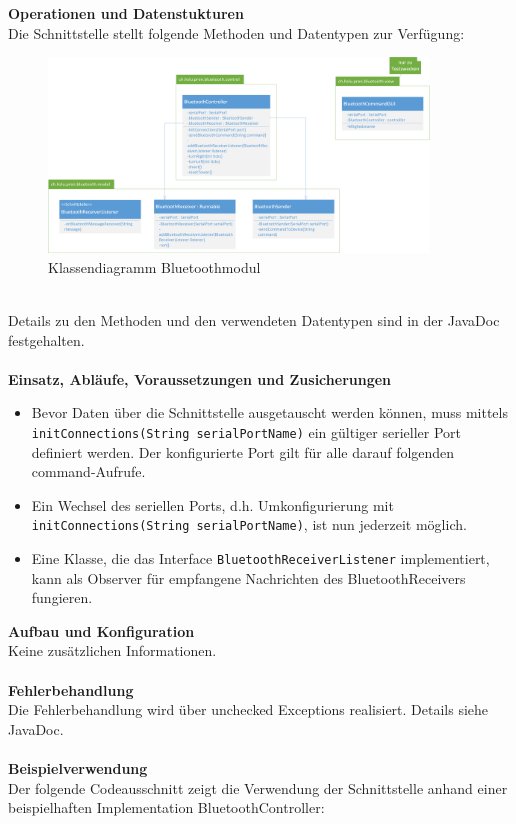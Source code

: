 \noindent
\textbf{Operationen und Datenstukturen} \\
Die Schnittstelle stellt folgende Methoden und Datentypen zur Verfügung:  \\
\begin{figure}[h!]          
	\centering             
	\includegraphics[width=0.9\textwidth, trim=0 10 0 0, clip=true]{../fig/Klassendiagramm_Bluetoothmodul.png}
	\caption{Klassendiagramm Bluetoothmodul}
	\label{fig:Klassendiagramm Bluetoothmodul}        
\end{figure} \\
Details zu den Methoden und den verwendeten Datentypen sind in der JavaDoc festgehalten. \\\\
\textbf{Einsatz, Abläufe, Voraussetzungen und Zusicherungen}
\begin{itemize}
	\item{Bevor Daten über die Schnittstelle ausgetauscht werden können, muss mittels \\
        \verb?initConnections(String serialPortName)? ein gültiger serieller 
        Port definiert werden. Der konfigurierte Port gilt für alle darauf 
        folgenden command-Aufrufe. }
	\item{Ein Wechsel des seriellen Ports, d.h. Umkonfigurierung mit \verb?initConnections(String serialPortName)?, ist nun jederzeit möglich.}
	\item{Eine Klasse, die das Interface \verb?BluetoothReceiverListener? implementiert, kann als Observer für empfangene Nachrichten des BluetoothReceivers fungieren.}
\end{itemize}
\textbf{Aufbau und Konfiguration} \\
Keine zusätzlichen Informationen. \\\\
\textbf{Fehlerbehandlung} \\
Die Fehlerbehandlung wird über unchecked Exceptions realisiert. Details siehe JavaDoc. \\\\
\textbf{Beispielverwendung} \\
Der folgende Codeausschnitt zeigt die Verwendung der Schnittstelle anhand 
einer beispielhaften Implementation BluetoothController: 


